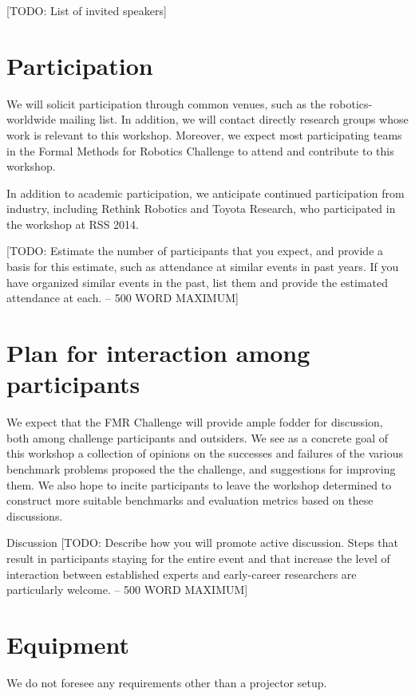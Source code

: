 \documentclass{amsart}
\theoremstyle{definition}
\begin{document}
[TODO: List of invited speakers]


\section{Participation}
We will solicit participation through common venues, such as the robotics-worldwide mailing list. In addition, we will contact directly research groups whose work is relevant to this workshop. Moreover, we expect most participating teams in the Formal Methods for Robotics Challenge to attend and contribute to this workshop. 

In addition to academic participation, we anticipate continued participation from industry, including Rethink Robotics and Toyota Research, who participated in the workshop at RSS 2014. 

[TODO: Estimate the number of participants that you expect, and provide a 
basis for this estimate, such as attendance at similar events in past years. If you have organized similar 
events in the past, list them and provide the estimated attendance at each. -- 500 WORD MAXIMUM]

\section{Plan for interaction among participants}
We expect that the FMR Challenge will provide ample fodder for discussion, both among challenge participants and outsiders. We see as a concrete goal of this workshop a collection of opinions on the successes and failures of the various benchmark problems proposed the the challenge, and suggestions for improving them. We also hope to incite participants to leave the workshop determined to construct more suitable benchmarks and evaluation metrics based on these discussions.

Discussion
[TODO: Describe how you will promote active discussion. Steps that result in participants staying for the entire
event and that increase the level of interaction between established experts and early-career researchers 
are particularly welcome. -- 500 WORD MAXIMUM]

\section{Equipment}
We do not foresee any requirements other than a projector setup.




\end{document}

